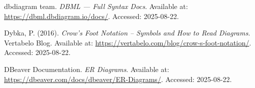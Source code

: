 \begin{thebibliography}{99}
dbdiagram team. \emph{DBML — Full Syntax Docs}. Available at:
\url{https://dbml.dbdiagram.io/docs/}. Accessed: 2025-08-22.

Dybka, P. (2016). \emph{Crow’s Foot Notation – Symbols and How to Read Diagrams}.
Vertabelo Blog. Available at:
\url{https://vertabelo.com/blog/crow-s-foot-notation/}. Accessed: 2025-08-22.

DBeaver Documentation. \emph{ER Diagrams}. Available at:
\url{https://dbeaver.com/docs/dbeaver/ER-Diagrams/}. Accessed: 2025-08-22.

    
\end{thebibliography}
